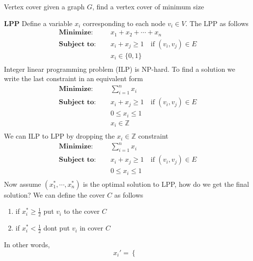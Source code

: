 \documentclass[11pt]{article}
\begin{document}
\begin{example}
    Vertex cover given a graph $G$, find a vertex cover of minimum size
    \begin{solution}
        \textbf{LPP} Define a variable $x_i$ corresponding to each node $v_i \in V$. The LPP as follows
        \begin{align*}
            \textbf{Minimize: }\quad & x_1 + x_2 + \cdots + x_n \\ 
            \textbf{Subject to: }\quad & x_i + x_j \geq 1 \quad \text{if } (v_i, v_j) \in E \\
                                & x_i \in \{ 0, 1 \} \\
        \end{align*}
        Integer linear programming problem (ILP) is NP-hard. To find a solution we write the last constraint in an equivalent form
        \begin{align*}
            \textbf{Minimize: }\quad & \sum_{i = 1}^n x_i \\ 
            \textbf{Subject to: }\quad & x_i + x_j \geq 1 \quad \text{if } (v_i, v_j) \in E \\
                                & 0 \leq x_i \leq 1 \\
                                & x_i \in \mathbb{Z} \\
        \end{align*}
       We can  ILP to LPP by dropping the $x_i \in \mathbb{Z}$ constraint
       \begin{align*}
            \textbf{Minimize: }\quad & \sum_{i = 1}^n x_i \\ 
            \textbf{Subject to: }\quad & x_i + x_j \geq 1 \quad \text{if } (v_i, v_j) \in E \\
                                & 0 \leq x_i \leq 1 \\
        \end{align*}
        Now assume $(x_1^*, \cdots, x_n^*)$ is the optimal solution to LPP, how do we get the final solution? We can define the cover $C$ as follows
        \begin{enumerate}
            \item if $x_i^* \geq \frac{1}{2}$ put $v_i$ to the cover $C$ 
            \item if $x_i^* < \frac{1}{2}$ dont put $v_i$ in cover $C$
        \end{enumerate}
        In other words, 
        \[
            x_i' = 
            \begin{cases}

\end{cases}\]
\end{solution}
\end{example}
\end{document}
